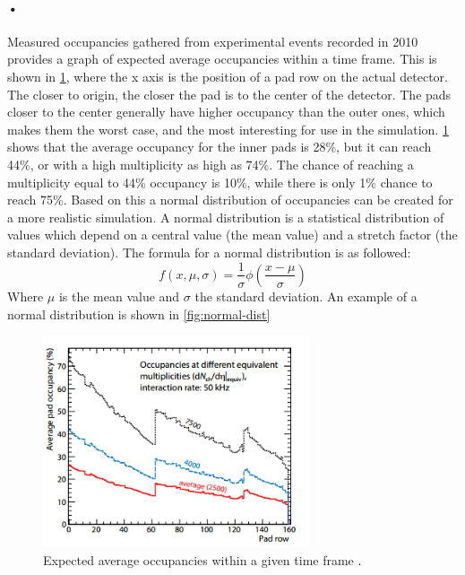 \documentclass[a4paper, 12pt]{report}
\begin{document}
\paragraph{•}
Measured occupancies gathered from experimental events recorded in 2010 provides a graph of expected average occupancies within a time frame.
This is shown in \ref{fig:expected-occupancy}, where the x axis is the position of a pad row on the actual detector.
The closer to origin, the closer the pad is to the center of the detector.
The pads closer to the center generally have higher occupancy than the outer ones, which makes them the worst case, and the most interesting for use in the simulation.
\ref{fig:expected-occupancy} shows that the average occupancy for the inner pads is 28\%, but it can reach 44\%, or with a high multiplicity as high as 74\%.
The chance of reaching a multiplicity equal to 44\% occupancy is 10\%, while there is only 1\% chance to reach 75\%.
Based on this a normal distribution of occupancies can be created for a more realistic simulation.
A normal distribution is a statistical distribution of values which depend on a central value (the mean value) and a stretch factor (the standard deviation)\cite{normal-dist}.
The formula for a normal distribution is as followed: 
\begin{equation}
f(x,\mu,\sigma) = \frac{1}{\sigma}\phi(\frac{x-\mu}{\sigma})  
\end{equation}
Where $ \mu$ is the mean value and $ \sigma$ the standard deviation. 
An example of a normal distribution is shown in \ref{fig:normal-dist}

\begin{figure}[H]
	\centering
		\includegraphics[width=0.7\textwidth]{images/expected-occupancy.png}
		\caption[Expected average occupancies within a given time frame for the entire detector.]{Expected average occupancies within a given time frame \cite{tdr-016}.}
		\label{fig:expected-occupancy}
\end{figure}
\end{document}
